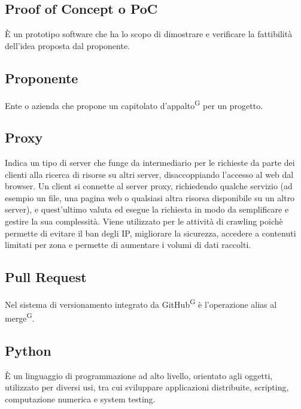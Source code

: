 \subsection{Proof of Concept o PoC}
È un prototipo software che ha lo scopo di dimostrare e verificare la fattibilità dell'idea proposta dal proponente.

\subsection{Proponente}
Ente o azienda che propone un capitolato d'appalto\textsuperscript{G} per un progetto.

\subsection{Proxy}
Indica un tipo di server che funge da intermediario per le richieste da parte dei clienti alla ricerca di risorse su altri server, disaccoppiando l'accesso al web dal browser. Un client si connette al server proxy, richiedendo qualche servizio (ad esempio un file, una pagina web o qualsiasi altra risorsa disponibile su un altro server), e quest'ultimo valuta ed esegue la richiesta in modo da semplificare e gestire la sua complessità. Viene utilizzato per le attività di crawling poichè permette di evitare il ban degli IP, migliorare la sicurezza, accedere a contenuti limitati per zona e permette di aumentare i volumi di dati raccolti. 

\subsection{Pull Request}
Nel sistema di versionamento integrato da GitHub\textsuperscript{G} è l'operazione alias al merge\textsuperscript{G}.

\subsection{Python} 
È un linguaggio di programmazione ad alto livello, orientato agli oggetti, utilizzato per diversi usi, tra cui sviluppare applicazioni distribuite, scripting, computazione numerica e system testing. 


\clearpage